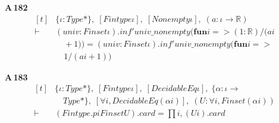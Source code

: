 \noindent\textbf{A\,182}\quad{}
{\footnotesize\[ \begin{aligned}[t]
&\{ \iota : \mathit{Type}*\},\; [\mathit{Fintype} \iota ],\; [\mathit{Nonempty} \iota ],\; (\mathit{a} : \iota \to \mathbb{R} )\\
\vdash\;&(\mathit{univ} : \mathit{Finset} \iota ).\mathit{inf'} \mathit{univ\_nonempty} (\mathbf{fun} \mathit{i} => (1:\mathbb{R} )/(\mathit{a} \mathit{i}\\
&\quad + 1)) = (\mathit{univ} : \mathit{Finset} \iota ).\mathit{inf'} \mathit{univ\_nonempty} (\mathbf{fun} \mathit{i} =>\\
&\quad 1/(\mathit{a} \mathit{i} + 1))
\end{aligned} \]}

\noindent\textbf{A\,183}\quad{}
{\footnotesize\[ \begin{aligned}[t]
&\{ \iota : \mathit{Type}*\},\; [\mathit{Fintype} \iota ],\; [\mathit{DecidableEq} \iota ],\; \{ \alpha : \iota \to\\
&\quad \mathit{Type}*\},\; [\forall \mathit{i}, \mathit{DecidableEq} (\alpha \mathit{i})],\; (\mathit{U} : \forall \mathit{i}, \mathit{Finset} (\alpha \mathit{i}))\\
\vdash\;&(\mathit{Fintype}.\mathit{piFinset} \mathit{U}).\mathit{card} = \textstyle\prod \mathit{i}, (\mathit{U} \mathit{i}).\mathit{card}
\end{aligned} \]}
